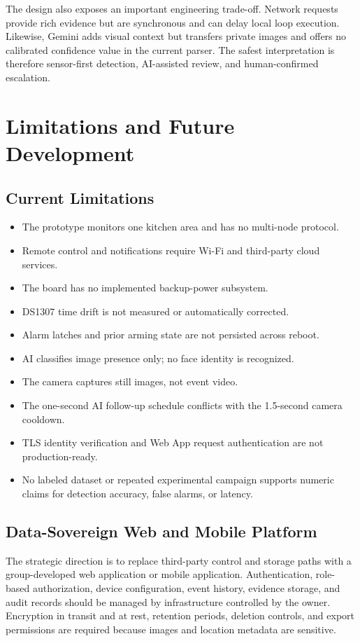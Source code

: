 \documentclass[11pt,a4paper]{report}
\begin{document}
The design also exposes an important engineering trade-off. Network requests
provide rich evidence but are synchronous and can delay local loop execution.
Likewise, Gemini adds visual context but transfers private images and offers no
calibrated confidence value in the current parser. The safest interpretation
is therefore sensor-first detection, AI-assisted review, and human-confirmed
escalation.

\chapter{Limitations and Future Development}

\section{Current Limitations}
\begin{itemize}
  \item The prototype monitors one kitchen area and has no multi-node protocol.
  \item Remote control and notifications require Wi-Fi and third-party cloud
        services.
  \item The board has no implemented backup-power subsystem.
  \item DS1307 time drift is not measured or automatically corrected.
  \item Alarm latches and prior arming state are not persisted across reboot.
  \item AI classifies image presence only; no face identity is recognized.
  \item The camera captures still images, not event video.
  \item The one-second AI follow-up schedule conflicts with the 1.5-second
        camera cooldown.
  \item TLS identity verification and Web App request authentication are not
        production-ready.
  \item No labeled dataset or repeated experimental campaign supports numeric
        claims for detection accuracy, false alarms, or latency.
\end{itemize}

\section{Data-Sovereign Web and Mobile Platform}
The strategic direction is to replace third-party control and storage paths
with a group-developed web application or mobile application. Authentication,
role-based authorization, device configuration, event history, evidence
storage, and audit records should be managed by infrastructure controlled by
the owner. Encryption in transit and at rest, retention periods, deletion
controls, and export permissions are required because images and location
metadata are sensitive.
\end{document}
